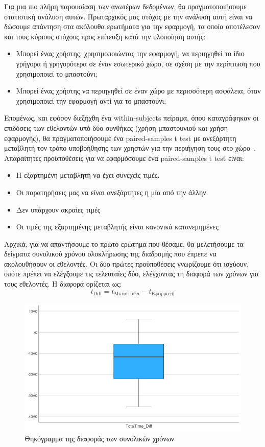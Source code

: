 Για μια πιο πλήρη παρουσίαση των ανωτέρων δεδομένων, θα πραγματοποιήσουμε στατιστική ανάλυση αυτών. Πρωταρχικός μας στόχος με την ανάλυση αυτή είναι να δώσουμε απάντηση στα ακόλουθα ερωτήματα για την εφαρμογή, τα οποία αποτέλεσαν και τους κύριους στόχους προς επίτευξη κατά την υλοποίηση αυτής:
\begin{itemize}
    \item Μπορεί ένας χρήστης, χρησιμοποιώντας την εφαρμογή, να περιηγηθεί το ίδιο γρήγορα ή γρηγορότερα σε έναν εσωτερικό χώρο, σε σχέση με την περίπτωση που χρησιμοποιεί το μπαστούνι;
    \item Μπορεί ένας χρήστης να περιηγηθεί σε έναν χώρο με περισσότερη ασφάλεια, όταν χρησιμοποιεί την εφαρμογή αντί για το μπαστούνι;
\end{itemize}
Επομένως, και εφόσον διεξήχθη ένα within-subjects πείραμα, όπου καταγράφηκαν οι επιδόσεις των εθελοντών υπό δύο συνθήκες (χρήση μπαστουνιού και χρήση εφαρμογής), θα πραγματοποιήσουμε ένα paired-samples t test με ανεξάρτητη μεταβλητή τον τρόπο υποβοήθησης των χρηστών για την περιήγηση τους στο χώρο~\cite{lazar_2017_research}. Απαραίτητες προϋποθέσεις για να εφαρμόσουμε ένα paired-samples t test είναι:
\begin{itemize}
    \item Η εξαρτημένη μεταβλητή να έχει συνεχείς τιμές.
    \item Οι παρατηρήσεις μας να είναι ανεξάρτητες η μία από την άλλην.
    \item Δεν υπάρχουν ακραίες τιμές
    \item Οι τιμές της εξαρτημένης μεταβλητής είναι κανονικά κατανεμημένες
\end{itemize}

Αρχικά, για να απαντήσουμε το πρώτο ερώτημα που θέσαμε, θα μελετήσουμε τα δείγματα συνολικού χρόνου ολοκλήρωσης της διαδρομής που έπρεπε να ακολουθήσουν οι εθελοντές. Οι δύο πρώτες προϋποθέσεις γνωρίζουμε ότι ισχύουν, οπότε πρέπει να ελέγξουμε τις τελευταίες δύο, ελέγχοντας τη διαφορά των χρόνων για τους εθελοντές. Η διαφορά ορίζεται ως:
\[
    t_{\text{Diff}} = t_{\text{Μπαστούνι}} - t_{\text{Εφαρμογή}}
\]

\begin{figure}[!h]
    \centering
    \includegraphics[width=0.8\linewidth]{./images/SA_Boxplot_TotalTimeDiff.png}
    \caption{Θηκόγραμμα της διαφοράς των συνολικών χρόνων}\label{fig:SABoxplotTTDiff}
\end{figure}

